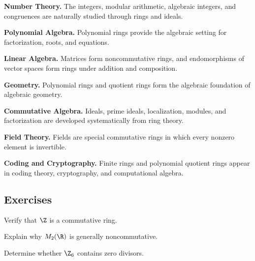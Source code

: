 \begin{applicationbox}
\textbf{Number Theory.}
The integers, modular arithmetic, algebraic integers, and congruences are
naturally studied through rings and ideals.

\medskip

\textbf{Polynomial Algebra.}
Polynomial rings provide the algebraic setting for factorization, roots, and
equations.

\medskip

\textbf{Linear Algebra.}
Matrices form noncommutative rings, and endomorphisms of vector spaces form
rings under addition and composition.

\medskip

\textbf{Geometry.}
Polynomial rings and quotient rings form the algebraic foundation of
algebraic geometry.

\medskip

\textbf{Commutative Algebra.}
Ideals, prime ideals, localization, modules, and factorization are developed
systematically from ring theory.

\medskip

\textbf{Field Theory.}
Fields are special commutative rings in which every nonzero element is
invertible.

\medskip

\textbf{Coding and Cryptography.}
Finite rings and polynomial quotient rings appear in coding theory,
cryptography, and computational algebra.
\end{applicationbox}

\subsection{Exercises}
\label{subsec:ring-theory-exercises}

\begin{exercise}[1]
Verify that \(\Z\) is a commutative ring.
\end{exercise}

\begin{exercise}[1]
Explain why \(M_2(\R)\) is generally noncommutative.
\end{exercise}

\begin{exercise}[1]
Determine whether \(\Z_6\) contains zero divisors.
\end{exercise}

